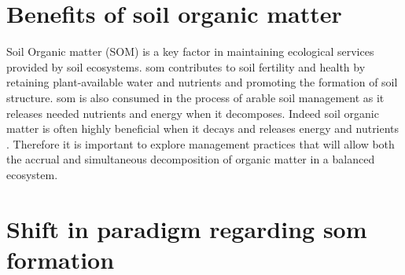 


\section{Benefits of soil organic matter}


	Soil Organic matter (SOM) is a key factor in maintaining ecological services provided by soil ecosystems.
	\gls{som} contributes to soil fertility and health by retaining plant-available water and nutrients and promoting the formation of soil structure. \gls{som} is also consumed in the process of arable soil management as it releases needed nutrients and energy when it decomposes. Indeed soil organic matter is often highly beneficial when it decays and releases energy and nutrients \citep{lehmann2015, janzen2006}. Therefore it is important to explore  management practices that will allow both the accrual and simultaneous  decomposition of organic matter in a balanced ecosystem.

\section{Shift in paradigm regarding \gls{som} formation}

